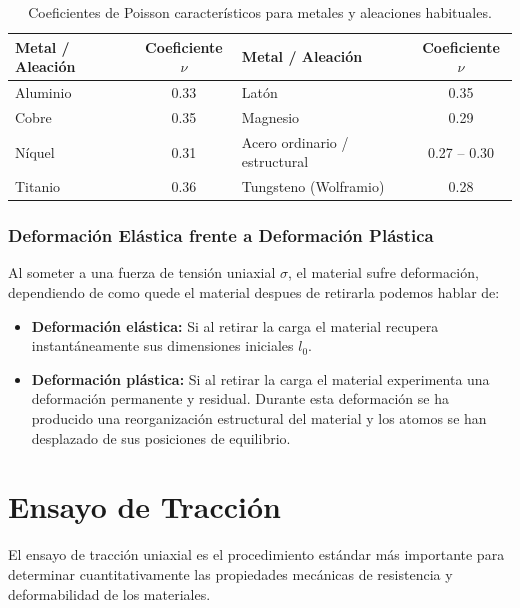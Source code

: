 \begin{table}[H]
    \centering
    \begin{tabular}{lc lc}
        \toprule
        \textbf{Metal / Aleación} & \textbf{Coeficiente $\nu$} & \textbf{Metal / Aleación}     & \textbf{Coeficiente $\nu$} \\
        \midrule
        Aluminio                  & 0.33                       & Latón                         & 0.35                       \\
        Cobre                     & 0.35                       & Magnesio                      & 0.29                       \\
        Níquel                    & 0.31                       & Acero ordinario / estructural & 0.27 -- 0.30               \\
        Titanio                   & 0.36                       & Tungsteno (Wolframio)         & 0.28                       \\
        \bottomrule
    \end{tabular}
    \caption{Coeficientes de Poisson característicos para metales y aleaciones habituales.}
    \label{tab:poisson_valores}
\end{table}

\subsubsection{Deformación Elástica frente a Deformación Plástica}
Al someter a una fuerza de tensión uniaxial $\sigma$, el material sufre deformación, dependiendo de como quede el material despues de retirarla podemos hablar de:

\begin{itemize}
    \item \textbf{Deformación elástica:} Si al retirar la carga el material recupera instantáneamente sus dimensiones iniciales $l_0$.
    \item \textbf{Deformación plástica:} Si al retirar la carga el material experimenta una deformación permanente y residual. Durante esta deformación se ha producido una reorganización estructural del material y los atomos se han desplazado de sus posiciones de equilibrio.
\end{itemize}
\newpage
\section{Ensayo de Tracción}

El ensayo de tracción uniaxial es el procedimiento estándar más importante para determinar cuantitativamente las propiedades mecánicas de resistencia y deformabilidad de los materiales.

